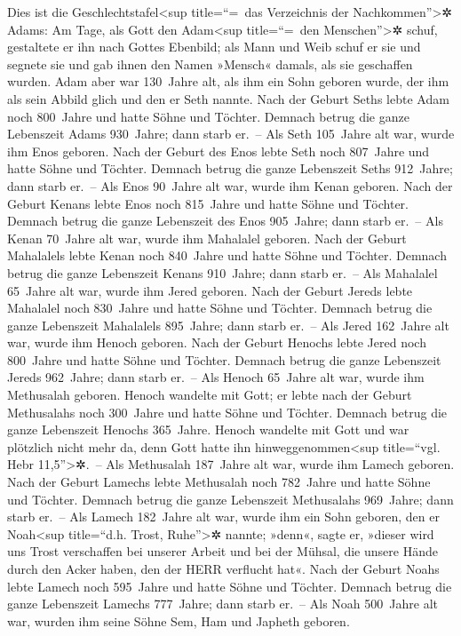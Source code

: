  Dies ist die Geschlechtstafel\textless sup title=``=~das
Verzeichnis der Nachkommen''\textgreater✲ Adams: Am Tage, als Gott den
Adam\textless sup title=``=~den Menschen''\textgreater✲ schuf,
gestaltete er ihn nach Gottes Ebenbild;  als Mann und Weib
schuf er sie und segnete sie und gab ihnen den Namen »Mensch« damals,
als sie geschaffen wurden.  Adam aber war 130~Jahre alt,
als ihm ein Sohn geboren wurde, der ihm als sein Abbild glich und den er
Seth nannte.  Nach der Geburt Seths lebte Adam noch
800~Jahre und hatte Söhne und Töchter.  Demnach betrug die
ganze Lebenszeit Adams 930~Jahre; dann starb er.~--  Als
Seth 105~Jahre alt war, wurde ihm Enos geboren.  Nach der
Geburt des Enos lebte Seth noch 807~Jahre und hatte Söhne und Töchter.
 Demnach betrug die ganze Lebenszeit Seths 912~Jahre; dann
starb er.~--  Als Enos 90~Jahre alt war, wurde ihm Kenan
geboren.  Nach der Geburt Kenans lebte Enos noch
815~Jahre und hatte Söhne und Töchter.  Demnach betrug
die ganze Lebenszeit des Enos 905~Jahre; dann starb er.~--
 Als Kenan 70~Jahre alt war, wurde ihm Mahalalel geboren.
 Nach der Geburt Mahalalels lebte Kenan noch 840~Jahre
und hatte Söhne und Töchter.  Demnach betrug die ganze
Lebenszeit Kenans 910~Jahre; dann starb er.~--  Als
Mahalalel 65~Jahre alt war, wurde ihm Jered geboren. 
Nach der Geburt Jereds lebte Mahalalel noch 830~Jahre und hatte Söhne
und Töchter.  Demnach betrug die ganze Lebenszeit
Mahalalels 895~Jahre; dann starb er.~--  Als Jered
162~Jahre alt war, wurde ihm Henoch geboren.  Nach der
Geburt Henochs lebte Jered noch 800~Jahre und hatte Söhne und Töchter.
 Demnach betrug die ganze Lebenszeit Jereds 962~Jahre;
dann starb er.~--  Als Henoch 65~Jahre alt war, wurde ihm
Methusalah geboren.  Henoch wandelte mit Gott; er lebte
nach der Geburt Methusalahs noch 300~Jahre und hatte Söhne und Töchter.
 Demnach betrug die ganze Lebenszeit Henochs 365~Jahre.
 Henoch wandelte mit Gott und war plötzlich nicht mehr
da, denn Gott hatte ihn hinweggenommen\textless sup title=``vgl. Hebr
11,5''\textgreater✲.~--  Als Methusalah 187~Jahre alt
war, wurde ihm Lamech geboren.  Nach der Geburt Lamechs
lebte Methusalah noch 782~Jahre und hatte Söhne und Töchter.
 Demnach betrug die ganze Lebenszeit Methusalahs
969~Jahre; dann starb er.~--  Als Lamech 182~Jahre alt
war, wurde ihm ein Sohn geboren,  den er
Noah\textless sup title=``d.h. Trost, Ruhe''\textgreater✲ nannte;
»denn«, sagte er, »dieser wird uns Trost verschaffen bei unserer Arbeit
und bei der Mühsal, die unsere Hände durch den Acker haben, den der HERR
verflucht hat«.  Nach der Geburt Noahs lebte Lamech noch
595~Jahre und hatte Söhne und Töchter.  Demnach betrug
die ganze Lebenszeit Lamechs 777~Jahre; dann starb er.~--
 Als Noah 500~Jahre alt war, wurden ihm seine Söhne Sem,
Ham und Japheth geboren.

